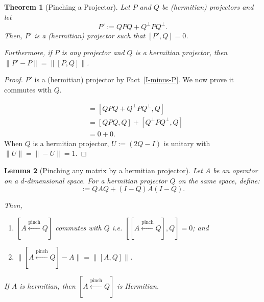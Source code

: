\documentclass[12pt]{article}
\theoremstyle{plain}
\newtheorem{theorem}{Theorem}[section]
\newtheorem{lemma}[theorem]{Lemma}
\begin{document}
\begin{theorem}[Pinching a Projector]
    Let $P$ and $Q$ be (hermitian) projectors and let 
    \[P' := QPQ + Q^\bot P Q^\bot.\]
    Then, $P'$ is a (hermitian) projector such that $[P', Q] = 0$. 
    
    \noindent Furthermore, if $P$ is any projector and $Q$ is a hermitian projector, then $\| P' - P \| = \|[P,Q] \| $.
\end{theorem}
\begin{proof}
$P'$ is a (hermitian) projector by Fact~\ref{I-minus-P}. We now prove it commutes with $Q$.

\begin{align*}
    [P', Q] &= [QPQ + Q^\bot P Q^\bot, Q]\\
    &= [QPQ, Q] + [Q^\bot P Q^\bot, Q]\\
    &= 0 + 0.
\end{align*}
When $Q$ is a hermitian projector, $U := (2Q - I)$ is unitary with $\|U\| = \|-U\| = 1$. %

\end{proof}




\begin{lemma}[Pinching any matrix by a hermitian projector]
Let $A$ be an operator on a $d$-dimensional space. For a hermitian projector $Q$ on the same space, define:
\begin{equation}
    [A \overset{\text{pinch}}{\gets} Q] :=  Q A Q + (I-Q) A (I - Q).
\end{equation}


\noindent Then,
\begin{enumerate}
    \item $[A \overset{\text{pinch}}{\gets} Q]$ commutes with $Q$ i.e. $[[A \overset{\text{pinch}}{\gets} Q], Q] = 0$; and
    \item $\| [A \overset{\text{pinch}}{\gets} Q] - A\| = \|[A,Q]\|$.
\end{enumerate}

\noindent If $A$ is hermitian, then $[A \overset{\text{pinch}}{\gets} Q]$ is Hermitian.

\end{lemma}
\end{document}
